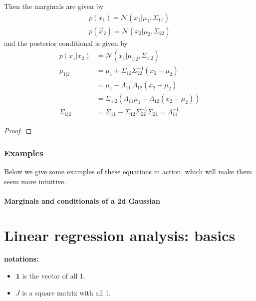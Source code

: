 \begin{refsection}
\begin{theorem}
	Then the marginals are given by
	\begin{equation}
	\begin{split}
	p(x_1)= \mathcal{N}(x_1|\mu_1,\Sigma_{11})\\
	p(\vec{x}_2)= \mathcal{N}(x_2|\mu_2,\Sigma_{22})
	\end{split}
	\end{equation}
	and the posterior conditional is given by
	\begin{equation}\label{eqn:Marginals-and-conditionals-of-an-MVN}
	\boxed{\begin{split}
		p(x_1|x_2)& =\mathcal{N}(x_1|\mu_{1|2},\Sigma_{1|2}) \\
		\mu_{1|2}& = \mu_1+\Sigma_{12}\Sigma_{22}^{-1}(x_2-\mu_2) \\
		& = \mu_1-\Lambda_{11}^{-1}\Lambda_{12}(x_2-\mu_2) \\
		& = \Sigma_{1|2}(\Lambda_{11}\mu_1-\Lambda_{12}(x_2-\mu_2)) \\
		\Sigma_{1|2}& = \Sigma_{11}-\Sigma_{12}\Sigma_{22}^{-1}\Sigma_{21}=\Lambda_{11}^{-1}
		\end{split}}
	\end{equation}
\end{theorem}
\begin{proof}
	
\end{proof}

\subsubsection{Examples}
Below we give some examples of these equations in action, which will make them seem more intuitive.


\paragraph{Marginals and conditionals of a 2d Gaussian}



\section{Linear regression analysis: basics}\label{ch:theory-of-statistics:sec:linear-regression-analysis}
\begin{mdframed}
	\textbf{notations:}
	\begin{itemize}
		\item $\bm{1}$ is the vector of all 1.
		\item $J$ is a square matrix with all 1.
	\end{itemize}
\end{mdframed}



\end{refsection}

